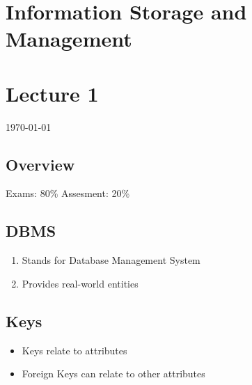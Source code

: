 \documentclass[12pt]{article}
\begin{document}
{\centering
\section*{Information Storage and Management}
\section*{Lecture 1}
\indent\today
}

\subsection*{Overview}
Exams: 80\% 
Assesment: 20\%


\subsection*{DBMS}
\begin{enumerate}
    \item Stands for Database Management System 
    \item Provides real-world entities
\end{enumerate}

\subsection*{Keys}
\begin{itemize}
    \item Keys relate to attributes
    \item Foreign Keys can relate to other attributes
\end{itemize}
\end{document}
